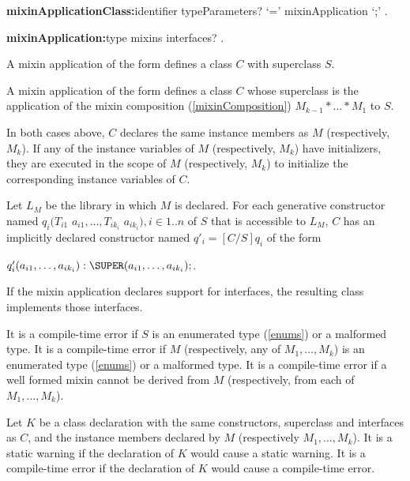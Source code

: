 \documentclass{article}
\begin{document}
\begin{grammar}
{\bf mixinApplicationClass:}identifier typeParameters? `=' mixinApplication `{\escapegrammar ;}'
  .

{\bf mixinApplication:}type mixins interfaces?
  .
\end{grammar}

\LMHash{}
A mixin application of the form  defines a class $C$ with superclass $S$.

\LMHash{}
A mixin application of the form  defines a class $C$ whose superclass is the application of the mixin composition (\ref{mixinComposition}) $M_{k-1} * \ldots * M_1$ to $S$.

\LMHash{}
In both cases above, $C$ declares the same instance members as $M$ (respectively, $M_k$).
If any of the instance variables of $M$ (respectively, $M_k$) have initializers, they are executed in the scope of $M$ (respectively, $M_k$) to initialize the corresponding instance variables of $C$.

\LMHash{}
Let $L_M$ be the library in which $M$ is declared.
For each generative constructor named $q_i(T_{i1}$ $ a_{i1}, \ldots , T_{ik_i}$ $ a_{ik_i}), i \in 1 .. n$ of $S$ that is accessible to $L_M$, $C$ has an implicitly declared constructor named
$q'_i = [C/S]q_i$ of the form

$q'_i(a_{i1}, \ldots , a_{ik_i}):\SUPER(a_{i1}, \ldots , a_{ik_i});$.


\LMHash{}
If the mixin application declares support for interfaces, the resulting class implements those interfaces.

\LMHash{}
It is a compile-time error if $S$ is an enumerated type (\ref{enums}) or a malformed type.
It is a compile-time error if $M$ (respectively, any of $M_1, \ldots, M_k$) is an enumerated type (\ref{enums}) or a malformed type.
It is a compile-time error if a well formed mixin cannot be derived from $M$ (respectively, from each of $M_1, \ldots, M_k$).

\LMHash{}
Let $K$ be a class declaration with the same constructors, superclass and interfaces as $C$, and the instance members declared by $M$ (respectively $M_1, \ldots, M_k$).
It is a static warning if the declaration of $K$ would cause a static warning.
It is a compile-time error if the declaration of $K$ would cause a compile-time error.

\end{document}
